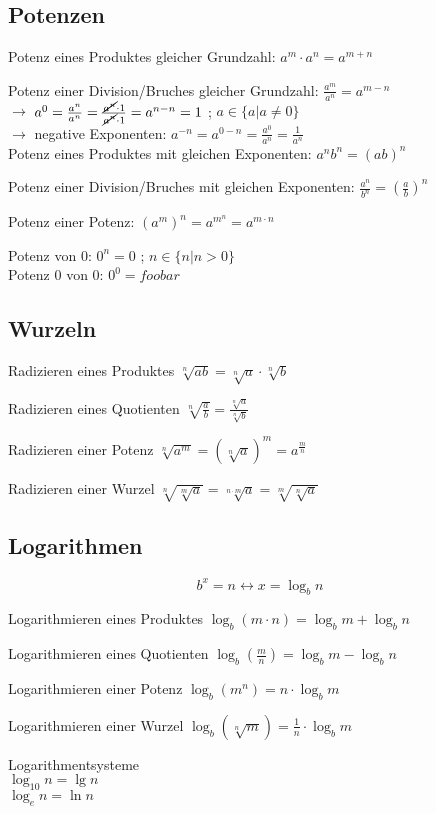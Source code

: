 \subsection{Potenzen}
Potenz eines Produktes gleicher Grundzahl: 
$a^m \cdot a^n = a^{m+n}$

Potenz einer Division/Bruches gleicher Grundzahl: $ \frac{a^m}{a^n} = a^{m-n}$ \\
$\longrightarrow$ $ a^0 =  \frac{a^n}{a^n} =   \frac{ \cancel{a^n} \cdot 1}{ \cancel{a^n} \cdot 1} = a^{n-n}  = 1$  ; $a \in \{a| a \neq 0\}$ \\
$\longrightarrow$ negative Exponenten: $ a^{-n} =  a^{0-n} =  \frac{a^0}{a^n}  =  \frac{1}{a^n} $ \\

Potenz eines Produktes mit gleichen Exponenten: $ {a^n}{b^n} = (ab)^{n}$ 

Potenz einer Division/Bruches mit gleichen Exponenten: $ \frac{a^n}{b^n} = (\frac{a}{b}) ^n$ 

Potenz einer Potenz: $ (a^m)^n = a^{m^n} = a^{m \cdot n}$ 

Potenz von 0: $ 0^n = 0 $ ;  $n \in\{n | n > 0\}$\\
Potenz 0 von 0: $ 0^0 = foobar $ 

\subsection{Wurzeln}

Radizieren eines Produktes $\sqrt[n]{ab} = \sqrt[n]{a} \cdot \sqrt[n]{b}$

Radizieren eines Quotienten $\sqrt[n]{\frac{a}{b} } = \frac{\sqrt[n]{a}}{\sqrt[n]{b}} $

Radizieren einer Potenz $\sqrt[n]{ a^m} = (\sqrt[n]{ a})^m = a^{\frac{m}{n}}$

Radizieren einer Wurzel $\sqrt[n]{\sqrt[m]{a}}  = \sqrt[n \cdot m]{a} = \sqrt[m]{\sqrt[n]{a}}$


\subsection{Logarithmen}
$$ b^x =n \longleftrightarrow x = \log_b n$$

Logarithmieren eines Produktes $\log_b (m \cdot n) = \log_b m + \log_b n $ 

Logarithmieren eines Quotienten $\log_b (\frac{m}{n}) = \log_b m - \log_b n  $ 

Logarithmieren einer Potenz $\log_b (m^n) =  n \cdot \log_b m $ 

Logarithmieren einer Wurzel $\log_b (\sqrt[n]{m}) =  \frac{1}{n} \cdot \log_b m $ 

Logarithmentsysteme \\
$\log_{10} n = \lg n $\\
$\log_{e} n = \ln n $

